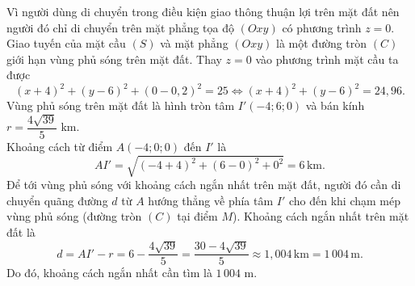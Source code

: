 \begin{ex}
{\begin{itemchoice}
\begin{center}
			\end{center}
			Vì người dùng di chuyển trong điều kiện giao thông thuận lợi trên mặt đất nên người đó chỉ di chuyển trên mặt phẳng tọa độ $(Oxy)$ có phương trình $z=0$.\\
			Giao tuyến của mặt cầu $(S)$ và mặt phẳng $(Oxy)$ là một đường tròn $(C)$ giới hạn vùng phủ sóng trên mặt đất.
			Thay $z=0$ vào phương trình mặt cầu ta được
			\[(x+4)^2+(y-6)^2+(0-0{,}2)^2=25 \Leftrightarrow (x+4)^2+(y-6)^2=24{,}96.\]
			Vùng phủ sóng trên mặt đất là hình tròn tâm $I'(-4;6;0)$ và bán kính $r=\dfrac{4\sqrt{39}}{5}$ km.
			\\
			Khoảng cách từ điểm $A(-4;0;0)$ đến $I'$ là
			\[AI'=\sqrt{(-4+4)^2+(6-0)^2+0^2}=6\mathrm{\,km}.\]
			Để tới vùng phủ sóng với khoảng cách ngắn nhất trên mặt đất, người đó cần di chuyển quãng đường $d$ từ $A$ hướng thẳng về phía tâm $I'$ cho đến khi chạm mép vùng phủ sóng (đường tròn $(C)$ tại điểm $M$). Khoảng cách ngắn nhất trên mặt đất là
			\[d=AI'-r=6-\dfrac{4\sqrt{39}}{5}=\dfrac{30-4\sqrt{39}}{5}\approx 1{,}004\mathrm{\,km}=1\,004\mathrm{\,m}.\]
			Do đó, khoảng cách ngắn nhất cần tìm là $1\,004$ m.
		\end{itemchoice}
	}
\end{ex}
\caukq
